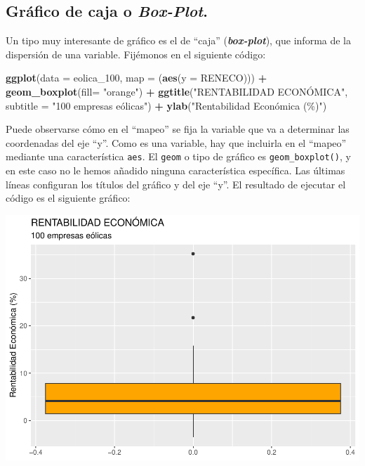\documentclass[
]{book}
\newenvironment{Shaded}{\begin{snugshade}}{\end{snugshade}}
\newcommand{\AttributeTok}[1]{\textcolor[rgb]{0.13,0.29,0.53}{#1}}
\newcommand{\FunctionTok}[1]{\textcolor[rgb]{0.13,0.29,0.53}{\textbf{#1}}}
\newcommand{\NormalTok}[1]{#1}
\newcommand{\SpecialCharTok}[1]{\textcolor[rgb]{0.81,0.36,0.00}{\textbf{#1}}}
\newcommand{\StringTok}[1]{\textcolor[rgb]{0.31,0.60,0.02}{#1}}
\let\Oldincludegraphics\includegraphics
\renewcommand{\includegraphics}[2][]{%
  \Oldincludegraphics[#1]{#2}%
}
\begin{document}
\subsection{\texorpdfstring{Gráfico de caja o \emph{Box-Plot}.}{Gráfico de caja o Box-Plot.}}\label{gruxe1fico-de-caja-o-box-plot.}

Un tipo muy interesante de gráfico es el de ``caja'' (\textbf{\emph{box-plot}}), que informa de la dispersión de una variable. Fijémonos en el siguiente código:

\begin{Shaded}
\begin{Highlighting}[]
\FunctionTok{ggplot}\NormalTok{(}\AttributeTok{data =}\NormalTok{ eolica\_100, }\AttributeTok{map =}\NormalTok{ (}\FunctionTok{aes}\NormalTok{(}\AttributeTok{y =}\NormalTok{ RENECO))) }\SpecialCharTok{+}
  \FunctionTok{geom\_boxplot}\NormalTok{(}\AttributeTok{fill=} \StringTok{"orange"}\NormalTok{) }\SpecialCharTok{+}
  \FunctionTok{ggtitle}\NormalTok{(}\StringTok{"RENTABILIDAD ECONÓMICA"}\NormalTok{, }\AttributeTok{subtitle =} \StringTok{"100 empresas eólicas"}\NormalTok{) }\SpecialCharTok{+}
  \FunctionTok{ylab}\NormalTok{(}\StringTok{"Rentabilidad Económica (\%)"}\NormalTok{)}
\end{Highlighting}
\end{Shaded}

Puede observarse cómo en el ``mapeo'' se fija la variable que va a determinar las coordenadas del eje ``y''. Como es una variable, hay que incluirla en el ``mapeo'' mediante una característica \texttt{aes}. El \texttt{geom} o tipo de gráfico es \texttt{geom\_boxplot()}, y en este caso no le hemos añadido ninguna característica específica. Las últimas líneas configuran los títulos del gráfico y del eje ``y''. El resultado de ejecutar el código es el siguiente gráfico:

\includegraphics{_main_files/figure-latex/unnamed-chunk-114-1.pdf}
\end{document}
